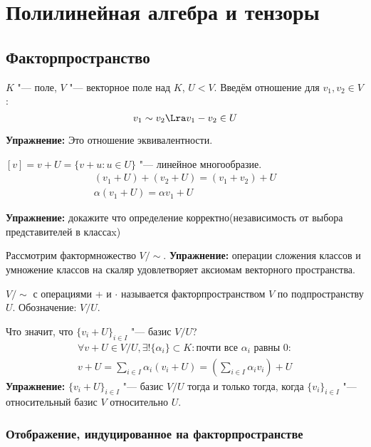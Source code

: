 ﻿\chapter{Полилинейная алгебра и тензоры}

\section{Факторпространство}

\begin{Def}
	$K$ "--- поле, $V$ "--- векторное поле над $K$, $U < V$.
	Введём отношение для $v_1, v_2 \in V$:
	\[ v_1 \sim v_2 \Lra v_1 - v_2 \in U \]
\end{Def}
\textbf{Упражнение:} Это отношение эквивалентности.

\begin{Def}
	$[v] = v + U = \{v + u\colon u \in U\}$ "--- линейное многообразие.
	\begin{gather*}
		(v_1 + U) + (v_2 + U) = (v_1 + v_2) + U \\
		\alpha(v_1 + U) = \alpha v_1 + U
	\end{gather*}
\end{Def}
\textbf{Упражнение:} докажите что определение корректно(независимость от выбора представителей в классаx)

Рассмотрим фактормножество $V/\sim$.
\textbf{Упражнение:} операции сложения классов и умножение классов на скаляр удовлетворяет аксиомам векторного пространства.

\begin{Def}
	$V/\sim$ с операциями + и $\cdot$ называется факторпространством $V$ по подпространству $U$.
	Обозначение: $V/U$.
\end{Def}
Что значит, что $\{v_i + U\}_{i \in I}$ "--- базис $V/U$?
\begin{gather*}
	\forall v + U \in V/U, \exists! \{\alpha_i\} \subset K\colon \text{почти все $\alpha_i$ равны 0}\colon \\
	v + U = \sum_{i \in I}\alpha_i(v_i + U) = \left(\sum_{i \in I}\alpha_i v_i\right) + U
\end{gather*}
\textbf{Упражнение:}
$\{v_i + U\}_{i \in I}$  "--- базис $V/U$ тогда и только тогда, когда
$\{v_i\}_{i \in I}$ "--- относительный базис $V$ относительно $U$.

\subsection{Отображение, индуцированное на факторпространстве}

